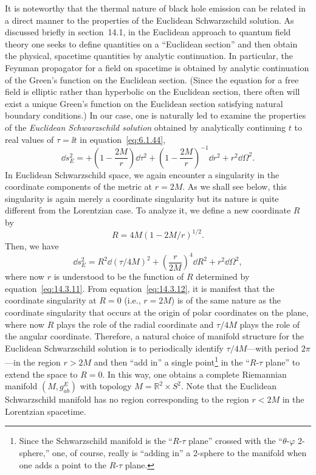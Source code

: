 It is noteworthy that the thermal nature of black hole emission can be related in a
direct manner to the properties of the Euclidean Schwarzschild solution. As
discussed briefly in section~14.1, in the Euclidean approach to quantum field theory
one seeks to define quantities on a ``Euclidean section'' and then obtain the physical,
spacetime quantities by analytic continuation. In particular, the Feynman propagator
for a field on spacetime is obtained by analytic continuation of the Green's function
on the Euclidean section. (Since the equation for a free field is elliptic rather than
hyperbolic on the Euclidean section, there often will exist a unique Green's function
on the Euclidean section satisfying natural boundary conditions.) In our case, one
is naturally led to examine the properties of the \emph{Euclidean Schwarzschild
solution} obtained by analytically continuing \(t\) to real values of \(\tau=\ii t\) in
equation~\eqref{eq:6.1.44},
\begin{equation}
  \dd s_E^2
  =+\left(1-\frac{2M}{r}\right)\dd\tau^2
   +\left(1-\frac{2M}{r}\right)^{-1}\dd r^2+r^2\dd\Omega^2.
  \tag{14.3.10}\label{eq:14.3.10}
\end{equation}
In Euclidean Schwarzschild space, we again encounter a singularity in the coordinate
components of the metric at \(r=2M\). As we shall see below, this singularity is
again merely a coordinate singularity but its nature is quite different from the
Lorentzian case. To analyze it, we define a new coordinate \(R\) by
\begin{equation}
  R=4M(1-2M/r)^{1/2}.
  \tag{14.3.11}\label{eq:14.3.11}
\end{equation}
Then, we have
\begin{equation}
  \dd s_E^2
  =R^2\dd(\tau/4M)^2+\left(\frac{r}{2M}\right)^4\dd R^2+r^2\dd\Omega^2,
  \tag{14.3.12}\label{eq:14.3.12}
\end{equation}
where now \(r\) is understood to be the function of \(R\) determined by
equation~\eqref{eq:14.3.11}. From equation~\eqref{eq:14.3.12}, it is manifest that
the coordinate singularity at \(R=0\) (i.e., \(r=2M\)) is of the same nature as the
coordinate singularity that occurs at the origin of polar coordinates on the plane,
where now \(R\) plays the role of the radial coordinate and \(\tau/4M\) plays the
role of the angular coordinate. Therefore, a natural choice of manifold structure
for the Euclidean Schwarzschild solution is to periodically identify \(\tau/4M\)---with
period \(2\pi\)---in the region \(r>2M\) and then ``add in'' a single
point\footnote{Since the Schwarzschild manifold is the ``\(R\)-\(\tau\) plane''
crossed with the ``\(\theta\)-\(\varphi\) 2-sphere,'' one, of course, really is
``adding in'' a 2-sphere to the manifold when one adds a point to the
\(R\)-\(\tau\) plane.} in the ``\(R\)-\(\tau\) plane'' to extend the space to
\(R=0\). In this way, one obtains a complete Riemannian manifold
\((M,g_{ab}^E)\) with topology \(M=\mathbb R^2\times S^2\). Note that the
Euclidean Schwarzschild manifold has no region corresponding to the region
\(r<2M\) in the Lorentzian spacetime.

